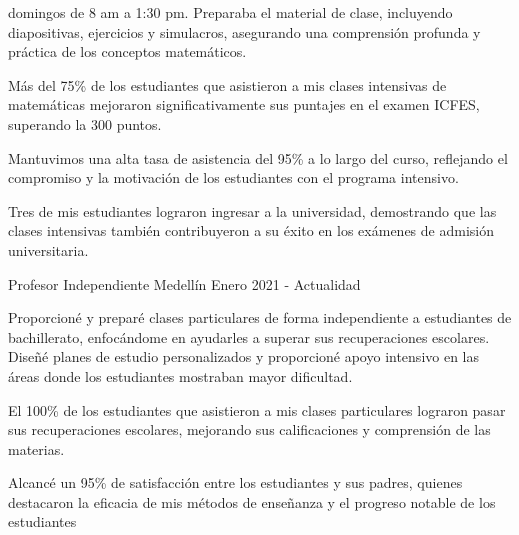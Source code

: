 \begin{cventries}
{\begin{cvitems}
{    domingos de 8 am a 1:30 pm. Preparaba el material de clase, incluyendo diapositivas, ejercicios y simulacros, asegurando
    una comprensión profunda y práctica de los conceptos matemáticos.}
    \item {Más del 75\% de los estudiantes que asistieron a mis clases intensivas de matemáticas mejoraron significativamente sus
    puntajes en el examen ICFES, superando la 300 puntos.}
    \item {Mantuvimos una alta tasa de asistencia del 95\% a lo largo del curso, reflejando el compromiso y la motivación de los
    estudiantes con el programa intensivo.}
    \item {Tres de mis estudiantes lograron ingresar a la universidad, demostrando que las clases intensivas también contribuyeron
    a su éxito en los exámenes de admisión universitaria.}
  \end{cvitems}
}
\cventry
{Profesor} %
{Independiente} %
{Medellín} %
{Enero 2021 - Actualidad} %
{
  \begin{cvitems}
    \item {Proporcioné y preparé clases particulares de forma independiente a estudiantes de bachillerato, enfocándome en ayudarles
    a superar sus recuperaciones escolares. Diseñé planes de estudio personalizados y proporcioné apoyo intensivo en las
    áreas donde los estudiantes mostraban mayor dificultad.}
    \item {El 100\% de los estudiantes que asistieron a mis clases particulares lograron pasar sus recuperaciones escolares,
    mejorando sus calificaciones y comprensión de las materias.}
    \item {Alcancé un 95\% de satisfacción entre los estudiantes y sus padres, quienes destacaron la eficacia de mis métodos de
    enseñanza y el progreso notable de los estudiantes}
  \end{cvitems}
}
\end{cventries}